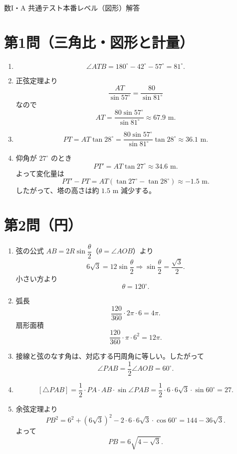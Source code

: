 \documentclass[a4paper,12pt]{jsarticle}
\begin{document}
\begin{center}
{\LARGE 数I・A 共通テスト本番レベル（図形）解答}
\end{center}

\vspace{1em}

\section*{第1問（三角比・図形と計量）}
\begin{enumerate}[label=\arabic*.]
  \item
  \[
  \angle ATB=180^\circ-42^\circ-57^\circ=81^\circ.
  \]
  \item 正弦定理より
  \[
  \frac{AT}{\sin57^\circ}=\frac{80}{\sin81^\circ}
  \]
  なので
  \[
  AT=\frac{80\sin57^\circ}{\sin81^\circ}\approx67.9\text{ m}.
  \]
  \item
  \[
  PT=AT\tan28^\circ
  =\frac{80\sin57^\circ}{\sin81^\circ}\tan28^\circ
  \approx36.1\text{ m}.
  \]
  \item 仰角が $27^\circ$ のとき
  \[
  PT' = AT\tan27^\circ\approx34.6\text{ m}.
  \]
  よって変化量は
  \[
  PT'-PT=AT(\tan27^\circ-\tan28^\circ)\approx-1.5\text{ m}.
  \]
  したがって、塔の高さは約 $1.5\text{ m}$ 減少する。
\end{enumerate}

\section*{第2問（円）}
\begin{enumerate}[label=\arabic*.]
  \item 弦の公式 $AB=2R\sin\dfrac\theta2$（$\theta=\angle AOB$）より
  \[
  6\sqrt3=12\sin\frac\theta2
  \Rightarrow \sin\frac\theta2=\frac{\sqrt3}{2}.
  \]
  小さい方より
  \[
  \theta=120^\circ.
  \]
  \item 弧長
  \[
  \frac{120}{360}\cdot2\pi\cdot6=4\pi.
  \]
  扇形面積
  \[
  \frac{120}{360}\cdot\pi\cdot6^2=12\pi.
  \]
  \item 接線と弦のなす角は、対応する円周角に等しい。したがって
  \[
  \angle PAB=\frac12\angle AOB=60^\circ.
  \]
  \item
  \[
  [\triangle PAB]=\frac12\cdot PA\cdot AB\cdot\sin\angle PAB
  =\frac12\cdot6\cdot6\sqrt3\cdot\sin60^\circ=27.
  \]
  \item 余弦定理より
  \[
  PB^2=6^2+(6\sqrt3)^2-2\cdot6\cdot6\sqrt3\cdot\cos60^\circ
  =144-36\sqrt3.
  \]
  よって
  \[
  PB=6\sqrt{4-\sqrt3}.
  \]
\end{enumerate}
\end{document}
